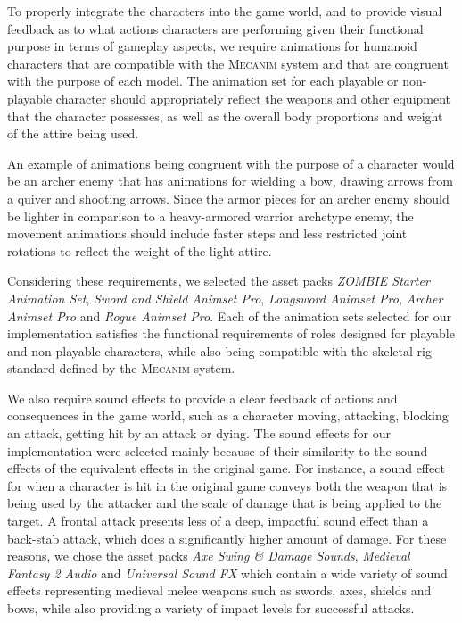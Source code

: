 To properly integrate the characters into the game world, and to provide visual feedback as to what actions characters are performing given their functional purpose in terms of gameplay aspects, we require animations for humanoid characters that are compatible with the \textsc{Mecanim} system and that are congruent with the purpose of each model. The animation set for each playable or non-playable character should appropriately reflect the weapons and other equipment that the character possesses, as well as the overall body proportions and weight of the attire being used.

An example of animations being congruent with the purpose of a character would be an archer enemy that has animations for wielding a bow, drawing arrows from a quiver and shooting arrows. Since the armor pieces for an archer enemy should be lighter in comparison to a heavy-armored warrior archetype enemy, the movement animations should include faster steps and less restricted joint rotations to reflect the weight of the light attire.

Considering these requirements, we selected the asset packs \emph{ZOMBIE Starter Animation Set}, \emph{Sword and Shield Animset Pro}, \emph{Longsword Animset Pro}, \emph{Archer Animset Pro} and \emph{Rogue Animset Pro}. Each of the animation sets selected for our implementation satisfies the functional requirements of roles designed for playable and non-playable characters, while also being compatible with the skeletal rig standard defined by the \textsc{Mecanim} system.

We also require sound effects to provide a clear feedback of actions and consequences in the game world, such as a character moving, attacking, blocking an attack, getting hit by an attack or dying. The sound effects for our implementation were selected mainly because of their similarity to the sound effects of the equivalent effects in the original game. For instance, a sound effect for when a character is hit in the original game conveys both the weapon that is being used by the attacker and the scale of damage that is being applied to the target. A frontal attack presents less of a deep, impactful sound effect than a back-stab attack, which does a significantly higher amount of damage. For these reasons, we chose the asset packs \emph{Axe Swing \& Damage Sounds}, \emph{Medieval Fantasy 2 Audio} and \emph{Universal Sound FX} which contain a wide variety of sound effects representing medieval melee weapons such as swords, axes, shields and bows, while also providing a variety of impact levels for successful attacks.

